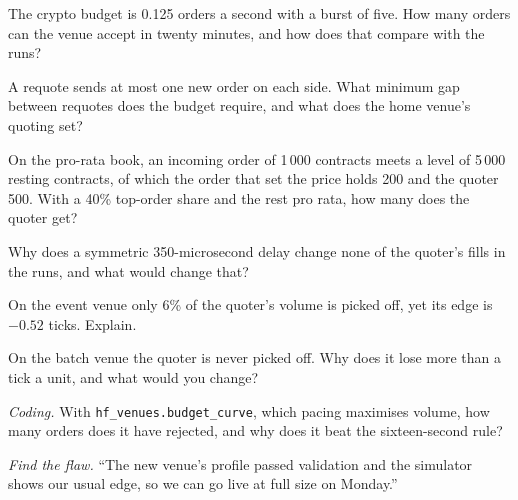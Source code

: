 \begin{exercise}[$\star$]\label{exo:hf:a-venue-playbook:1}
The crypto budget is 0.125 orders a second with a burst of five. How many orders can the venue accept in twenty minutes, and how does that compare
with the runs?
\end{exercise}

\begin{exercise}[$\star$]\label{exo:hf:a-venue-playbook:2}
A requote sends at most one new order on each side. What minimum gap between requotes does the budget require, and what does the home venue's
quoting set?
\end{exercise}

\begin{exercise}[$\star$]\label{exo:hf:a-venue-playbook:3}
On the pro-rata book, an incoming order of 1\,000 contracts meets a level of 5\,000 resting contracts, of which the order that set the price holds
200 and the quoter 500. With a 40\% top-order share and the rest pro rata, how many does the quoter get?
\end{exercise}

\begin{exercise}[$\star\star$]\label{exo:hf:a-venue-playbook:4}
Why does a symmetric 350-microsecond delay change none of the quoter's fills in the runs, and what would change that?
\end{exercise}

\begin{exercise}[$\star\star$]\label{exo:hf:a-venue-playbook:5}
On the event venue only 6\% of the quoter's volume is picked off, yet its edge is $-0.52$ ticks. Explain.
\end{exercise}

\begin{exercise}[$\star\star$]\label{exo:hf:a-venue-playbook:6}
On the batch venue the quoter is never picked off. Why does it lose more than a tick a unit, and what would you change?
\end{exercise}

\begin{exercise}[$\star\star\star$]\label{exo:hf:a-venue-playbook:7}
\emph{Coding.} With \texttt{hf\_venues.budget\_curve}, which pacing maximises volume, how many orders does it have rejected, and why does it beat the
sixteen-second rule?
\end{exercise}

\begin{exercise}[$\star\star\star$]\label{exo:hf:a-venue-playbook:8}
\emph{Find the flaw.} ``The new venue's profile passed validation and the simulator shows our usual edge, so we can go live at full size on Monday.''
\end{exercise}

